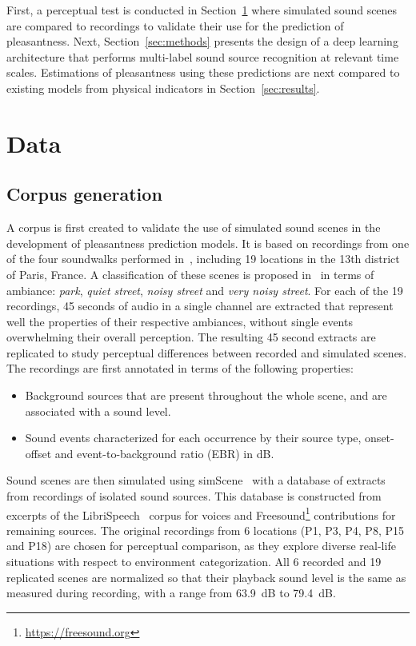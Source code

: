 \documentclass[11pt,a4paper]{article}
\begin{document}
First, a perceptual test is conducted in Section~\ref{sec:data} where simulated sound scenes are compared to recordings to validate their use for the prediction of pleasantness. Next, Section~\ref{sec:methods} presents the design of a deep learning architecture that performs multi-label sound source recognition at relevant time scales. Estimations of pleasantness using these predictions are next compared to existing models from physical indicators in Section~\ref{sec:results}.


\section{Data}
\label{sec:data}

\subsection{Corpus generation}
\label{sec:data_corp}

A corpus is first created to validate the use of simulated sound scenes in the development of pleasantness prediction models. It is based on recordings from one of the four soundwalks performed in~\cite{aumond2017}, including 19 locations in the 13th district of Paris, France. A classification of these scenes is proposed in~\cite{gloaguen2017} in terms of ambiance: \textit{park}, \textit{quiet street}, \textit{noisy street} and \textit{very noisy street}. For each of the 19 recordings, 45 seconds of audio in a single channel are extracted that represent well the properties of their respective ambiances, without single events overwhelming their overall perception. The resulting 45 second extracts are replicated to study perceptual differences between recorded and simulated scenes. The recordings are first annotated in terms of the following properties:

\begin{itemize}
\item Background sources that are present throughout the whole scene, and are associated with a sound level.
\item Sound events characterized for each occurrence by their source type, onset-offset and event-to-background ratio (EBR) in dB.
\end{itemize}

Sound scenes are then simulated using simScene~\cite{rossignol2015} with a database of extracts from recordings of isolated sound sources. This database is constructed from excerpts of the LibriSpeech~\cite{panayotov2015} corpus for voices and Freesound\footnote{\url{https://freesound.org}} contributions for remaining sources. The original recordings from 6 locations (P1, P3, P4, P8, P15 and P18) are chosen for perceptual comparison, as they explore diverse real-life situations with respect to environment categorization. All 6 recorded and 19 replicated scenes are normalized so that their playback sound level is the same as measured during recording, with a range from 63.9~dB to 79.4~dB.\\
\end{document}
